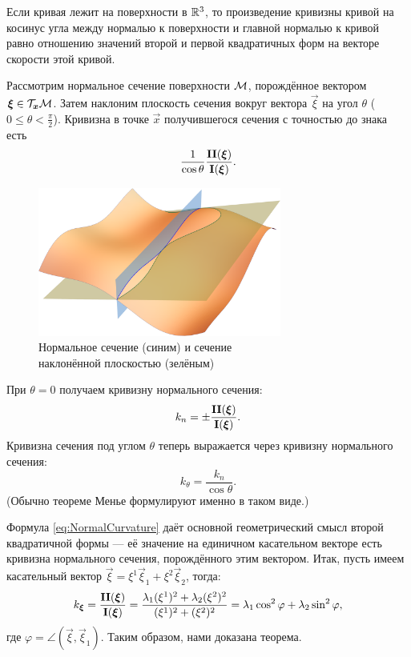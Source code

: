 
\begin{theorem}
	Если кривая лежит на поверхности в $\mathbb{R}^3$, то произведение кривизны кривой на косинус угла между нормалью к поверхности и главной нормалью к кривой равно отношению значений второй и первой квадратичных форм на векторе скорости этой кривой.
\end{theorem}

\begin{corollary}
	Рассмотрим нормальное сечение поверхности $\mathcal{M}$, порождённое вектором $\boldsymbol{\xi} \in \mathcal{T}_{\boldsymbol{x}}\mathcal{M}$. Затем наклоним плоскость сечения вокруг вектора $\vec{\xi}$ на угол $\theta$ ($0 \leqslant \theta < \frac{\pi}{2}$). Кривизна в точке $\vec{x}$ получившегося сечения с точностью до знака есть
	\[
		\frac{1}{\cos\theta}\frac{\boldsymbol{\operatorname{II}}(\boldsymbol{\xi})}{\boldsymbol{\operatorname{I}}(\boldsymbol{\xi})}.
	\]
\end{corollary}

\begin{figure}[H]
	\centering
	\includegraphics[width=8cm]{./img/ThetaSection.pdf}
	\caption{Нормальное сечение (синим) и сечение\\ наклонённой плоскостью (зелёным)}
\end{figure}

\noindent%
При $\theta = 0$ получаем кривизну нормального сечения:
\begin{equation} \label{eq:NormalCurvature}
	k_n = \pm\frac{\boldsymbol{\operatorname{II}}(\boldsymbol{\xi})}{\boldsymbol{\operatorname{I}}(\boldsymbol{\xi})}.
\end{equation}
Кривизна сечения под углом $\theta$ теперь выражается через кривизну нормального сечения:
\[
	k_{\theta} = \frac{k_n}{\cos\theta}.
\]
(Обычно теореме Менье формулируют именно в таком виде.)

Формула \ref{eq:NormalCurvature} даёт основной геометрический смысл второй квадратичной формы --- её значение на единичном касательном векторе есть кривизна нормального сечения, порождённого этим вектором. Итак, пусть имеем касательный вектор $\vec{\xi} = \xi^1\vec{\xi}_1 + \xi^2\vec{\xi}_2$, тогда:
\[
	k_{\boldsymbol{\xi}} = \frac{\boldsymbol{\operatorname{II}}(\boldsymbol{\xi})}{\boldsymbol{\operatorname{I}}(\boldsymbol{\xi})} = \frac{\lambda_1(\xi^1)^2 + \lambda_2(\xi^2)^2}{(\xi^1)^2 + (\xi^2)^2} = \lambda_1\cos^2\varphi + \lambda_2\sin^2\varphi,
\]
где $\varphi = \angle(\vec{\xi}, \vec{\xi}_1)$. Таким образом, нами доказана теорема.

